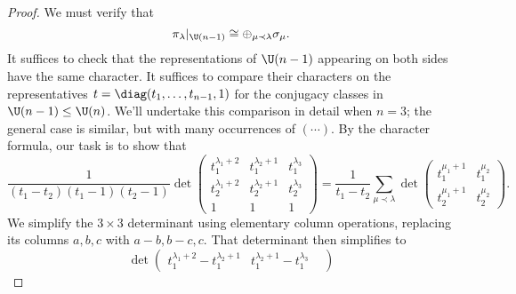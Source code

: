 \documentclass[reqno]{amsart} 
\begin{document}
\begin{proof}
  We must verify that
  \begin{equation}\label{eq:restrict-Un-Unmi1-reps}
    \pi_{\lambda}|_{\U(n-1)}
    \cong
    \oplus_{\mu \prec \lambda}
    \sigma_{\mu}.
  \end{equation}
  It suffices to check that the representations of $\U(n-1)$ appearing on both sides have the same character.  It suffices to compare their characters on the representatives $t = \diag(t_1,\dotsc,t_{n-1},1)$ for the conjugacy classes in $\U(n-1) \leq \U(n)$.  We'll undertake this comparison in detail when $n = 3$; the general case is similar, but with many occurrences of $(\dotsb)$.  By the character formula, our task is to show that
  \begin{equation}\label{eq:}
    \frac{1}{(t_1 - t_2) (t_1 - 1) (t_2 - 1)}
    \det 
\begin{pmatrix}
      t_1^{\lambda_1 + 2} & t_1^{\lambda_2 + 1} &
                                                  t_1^{\lambda_3} \\
      t_2^{\lambda_1 + 2} & t_2^{\lambda_2 + 1} &
                                                  t_2^{\lambda_3} \\
      1 & 1 & 1      
    \end{pmatrix}
    =
    \frac{1}{t_1 - t_2}
    \sum_{\mu \prec \lambda}
    \det
    \begin{pmatrix}
      t_1^{\mu_1 + 1} & t_1^{\mu_2} \\
      t_2^{\mu_1 + 1} & t_2^{\mu_2}
    \end{pmatrix}
.
  \end{equation}
  We simplify the $3 \times 3$ determinant using elementary column operations, replacing its columns $a,b,c$ with $a-b, b-c, c$.  That determinant then simplifies to
  \begin{equation}\label{eq:}
    \det 
\begin{pmatrix}
      t_1^{\lambda_1 + 2} - t_1^{\lambda_2 + 1}
      & t_1^{\lambda_2 + 1} - t_1^{\lambda_3} &

\end{pmatrix}
\end{equation}
\end{proof}
\end{document}
